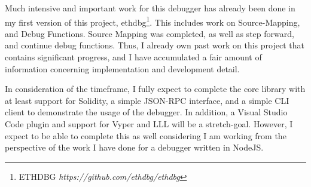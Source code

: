 \documentclass[]{report}
\begin{document}
Much intensive and important work for this debugger has already been done in my first version of this project, ethdbg\footnote{ETHDBG \textit{https://github.com/ethdbg/ethdbg}}. This includes work on Source-Mapping, and Debug Functions. Source Mapping was completed, as well as step forward, and continue debug functions. Thus, I already own past work on this project that contains significant progress, and I have accumulated a fair amount of information concerning implementation and development detail.

In consideration of the timeframe, I fully expect to complete the core library with at least support for Solidity, a simple JSON-RPC interface, and a simple CLI client to demonstrate the usage of the debugger. In addition, a Visual Studio Code plugin and support for Vyper and LLL will be a stretch-goal. However, I expect to be able to complete this as well considering I am working from the perspective of the work I have done for a debugger written in NodeJS.
\end{document}
